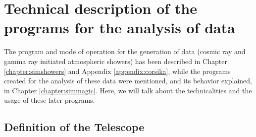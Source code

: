 

\chapter{Technical description of the programs for the analysis of \MC data}
\label{appendix:programs}

The program and mode of operation for the generation of \MC data
(cosmic ray and gamma ray initiated atmospheric showers) has been
described in Chapter \ref{chapter:simshowers} and Appendix
\ref{appendix:corsika}, while the programs created for the analysis of
these \MC data were mentioned, and its behavior explained, in Chapter
\ref{chapter:simmagic}. Here, we will talk about the technicalities
and the usage of these later programs.

\afterpage{\clearpage}


\section{Definition of the Telescope}
\label{sec:ctdef}

